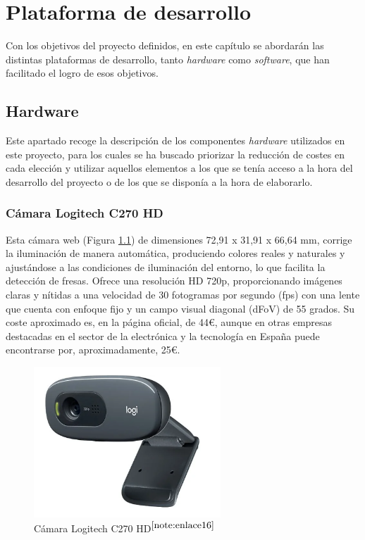 \chapter{Plataforma de desarrollo}
\label{cap:capitulo4}
 
Con los objetivos del proyecto definidos, en este capítulo se abordarán las distintas plataformas de desarrollo, tanto \textit{hardware} como \textit{software}, que han facilitado el logro de esos objetivos.

\section{Hardware}
\label{sec:hardware}

Este apartado recoge la descripción de los componentes \textit{hardware} utilizados en este proyecto, para los cuales se ha buscado priorizar la reducción de costes en cada elección y utilizar aquellos elementos a los que se tenía acceso a la hora del desarrollo del proyecto o de los que se disponía a la hora de elaborarlo.

\subsection{Cámara Logitech C270 HD}
\label{subsec:logiC270HD}

Esta cámara web (Figura \ref{fig:logiC270HD}) de dimensiones 72,91 x 31,91 x 66,64 mm, corrige la iluminación de manera automática, produciendo colores reales y naturales y ajustándose a las condiciones de iluminación del entorno, lo que facilita la detección de fresas. Ofrece una resolución HD 720p, proporcionando imágenes claras y nítidas a una velocidad de 30 fotogramas por segundo (fps) con una lente que cuenta con enfoque fijo y un campo visual diagonal (dFoV) de 55 grados. Su coste aproximado es, en la página oficial, de 44€, aunque en otras empresas destacadas en el sector de la electrónica y la tecnología en España puede encontrarse por, aproximadamente, 25€.

\begin{figure} [H]
    \begin{center}
      \includegraphics[width=7cm]{figs/logi C270.png}
    \end{center}
    \caption{Cámara Logitech C270 HD$^{\ref{note:enlace16}}$}
    \label{fig:logiC270HD}
\end{figure}

